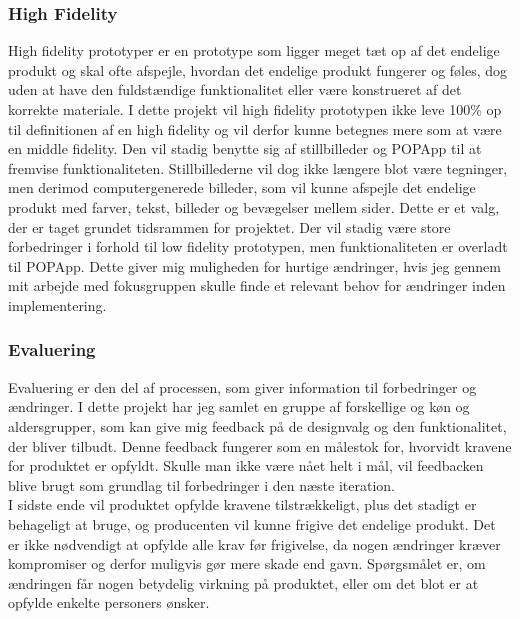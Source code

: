 \documentclass[a4paper,10pt,titlepage]{article}
\begin{document}
\subsubsection*{High Fidelity}
High fidelity prototyper er en prototype som ligger meget tæt op af det endelige produkt og skal ofte afspejle, hvordan det endelige produkt fungerer og føles, dog uden at have den fuldstændige funktionalitet eller være konstrueret af det korrekte materiale. I dette projekt vil high fidelity prototypen ikke leve 100\% op til definitionen af en high fidelity og vil derfor kunne betegnes mere som at være en middle fidelity. Den vil stadig benytte sig af stillbilleder og POPApp til at fremvise funktionaliteten. Stillbillederne vil dog ikke længere blot være tegninger, men derimod computergenerede billeder, som vil kunne afspejle det endelige produkt med farver, tekst, billeder og bevægelser mellem sider. Dette er et valg, der er taget grundet tidsrammen for projektet. Der vil stadig være store forbedringer i forhold til low fidelity prototypen, men funktionaliteten er overladt til POPApp. Dette giver mig muligheden for hurtige ændringer, hvis jeg gennem mit arbejde med fokusgruppen skulle finde et relevant behov for ændringer inden implementering.
\subsubsection{Evaluering}
Evaluering er den del af processen, som giver information til forbedringer og ændringer. I dette projekt har jeg samlet en gruppe af forskellige og køn og aldersgrupper, som kan give mig feedback på de designvalg og den funktionalitet, der bliver tilbudt. Denne feedback fungerer som en målestok for, hvorvidt kravene for produktet er opfyldt. Skulle man ikke være nået helt i mål, vil feedbacken blive brugt som grundlag til forbedringer i den næste iteration.\\
I sidste ende vil produktet opfylde kravene tilstrækkeligt, plus det stadigt er behageligt at bruge, og producenten vil kunne frigive det endelige produkt. Det er ikke nødvendigt at opfylde alle krav før frigivelse, da nogen ændringer kræver kompromiser og derfor muligvis gør mere skade end gavn. Spørgsmålet er, om ændringen får nogen betydelig virkning på produktet, eller om det blot er at opfylde enkelte personers ønsker.
\end{document}
